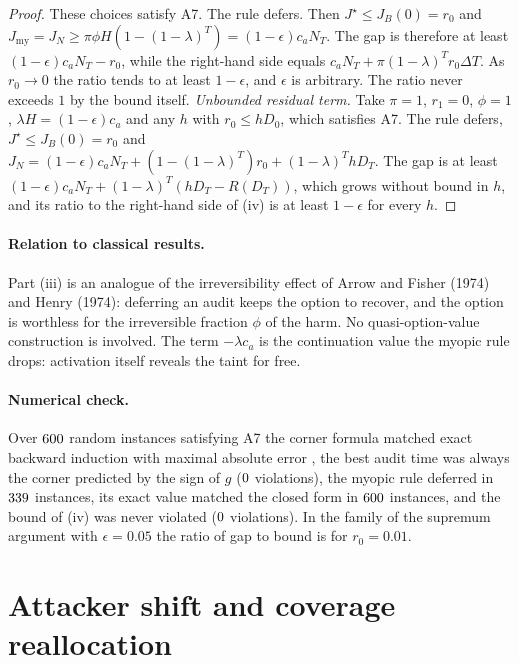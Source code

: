 \documentclass[11pt]{article}
\theoremstyle{definition}
\begin{document}
\begin{proof}
These choices satisfy A7. The rule defers. Then $J^\star\le J_B(0)=r_0$ and
$J_{\mathrm{my}}=J_N\ge\pi\phi H(1-(1-\lambda)^T)=(1-\epsilon)c_aN_T$. The gap is therefore at least
$(1-\epsilon)c_aN_T-r_0$, while the right-hand side equals $c_aN_T+\pi(1-\lambda)^Tr_0\Delta T$. As $r_0\to0$
the ratio tends to at least $1-\epsilon$, and $\epsilon$ is arbitrary. The ratio never exceeds $1$ by the
bound itself. \emph{Unbounded residual term.} Take $\pi=1$, $r_1=0$, $\phi=1$, $\lambda H=(1-\epsilon)c_a$ and
any $h$ with $r_0\le hD_0$, which satisfies A7. The rule defers, $J^\star\le J_B(0)=r_0$ and
$J_N=(1-\epsilon)c_aN_T+(1-(1-\lambda)^T)r_0+(1-\lambda)^ThD_T$. The gap is at least
$(1-\epsilon)c_aN_T+(1-\lambda)^T(hD_T-R(D_T))$, which grows without bound in $h$, and its ratio to the
right-hand side of (iv) is at least $1-\epsilon$ for every $h$.
\end{proof}

\paragraph{Relation to classical results.} Part (iii) is an analogue of the irreversibility effect of Arrow
and Fisher (1974) and Henry (1974): deferring an audit keeps the option to recover, and the option is
worthless for the irreversible fraction $\phi$ of the harm. No quasi-option-value construction is involved.
The term $-\lambda c_a$ is the continuation value the myopic rule drops: activation itself reveals the taint
for free.

\paragraph{Numerical check.} Over $600$ random instances satisfying A7 the corner formula matched
exact backward induction with maximal absolute error \TTwoMaxErr{}, the best audit time was always the corner
predicted by the sign of $g$ ($0$ violations), the myopic rule deferred in $339$
instances, its exact value matched the closed form in $600$ instances, and the bound of (iv) was
never violated ($0$ violations). In the family of the supremum argument with $\epsilon=0.05$ the
ratio of gap to bound is \TTwoTightRatio{} for $r_0=0.01$.

\section{Attacker shift and coverage reallocation}
\end{document}
